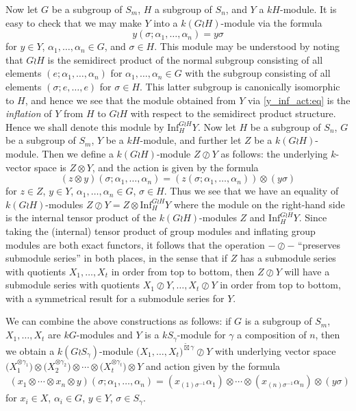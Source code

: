 \documentclass[10pt]{article}
\theoremstyle{definition}
\begin{document}
Now let $G$ be a subgroup of $S_m$, $H$ a subgroup of $S_n$, and $Y$ a $kH$-module. It is easy to check that we may make $Y$ into a
$k(G{\wr}H)$-module via the formula
\begin{equation}\label{y_inf_act:eq}
y(\sigma;\alpha_1,\ldots,\alpha_n) = y\sigma
\end{equation}
for $y \in Y$, $\alpha_1,\ldots,\alpha_n \in G$, and $\sigma \in H$. This module may be understood by noting that $G{\wr}H$ is the
semidirect product of the normal subgroup consisting of all elements $(e;\alpha_1,\ldots,\alpha_n)$ for $\alpha_1,\ldots,\alpha_n \in G$
with the subgroup consisting of all elements $(\sigma;e,\ldots,e)$ for $\sigma \in H$. This latter subgroup is canonically isomorphic to
$H$, and hence we see that the module obtained from $Y$ via \eqref{y_inf_act:eq} is the \textit{inflation} of $Y$ from $H$ to $G{\wr}H$
with respect to the semidirect product
structure. Hence we shall denote this module by $\mathrm{Inf}^{G{\wr}H}_H Y$.
Now let $H$ be a subgroup of $S_n$, $G$ be a subgroup of $S_m$, $Y$ be a $kH$-module, and further let $Z$ be a $k(G{\wr}H)$-module. Then
we define a $k(G{\wr}H)$-module $Z{\oslash}Y$ as follows: the underlying $k$-vector space is $Z{\otimes}Y$, and
the action is given by the formula
\[(z \otimes y)(\sigma;\alpha_1,\ldots,\alpha_n) = (z(\sigma;\alpha_1,\ldots,\alpha_n))\otimes(y\sigma)\]
for $z \in Z$, $y \in Y$, $\alpha_1,\ldots,\alpha_n \in G$, $\sigma \in H$.
Thus we see that we have an equality of $k(G{\wr}H)$-modules $Z{\oslash}Y = Z \otimes \mathrm{Inf}^{G{\wr}H}_H Y$
where the module on the right-hand side is the internal tensor product of the $k(G{\wr}H)$-modules $Z$ and $\mathrm{Inf}^{G{\wr}H}_H Y$.
Since taking the (internal) tensor product of group modules and inflating group modules are both exact functors, it follows that the
operation $- \oslash -$ ``preserves submodule series'' in both places, in the sense that if $Z$ has a submodule series with quotients
$X_1,\ldots,X_t$ in order from top to bottom, then $Z \oslash Y$ will have a submodule series with quotients $X_1 \oslash Y, \ldots,
X_t \oslash Y$ in order from top to bottom, with a symmetrical result for a submodule series for $Y$.

We can combine the above constructions as follows: if $G$ is a subgroup of $S_m$, $X_1,\ldots,X_t$ are $kG$-modules and $Y$ is a
$kS_{\gamma}$-module for $\gamma$ a composition of $n$, then we obtain a $k(G{\wr}S_{\gamma})$-module
$\bigl(X_1,\ldots,X_t\bigr)^{\widetilde\boxtimes\gamma}{\oslash}Y$
with underlying vector space
$\bigl(X^{\otimes \gamma_1}_1\bigr)\otimes\bigl(X^{\otimes \gamma_2}_2\bigr)\otimes\cdots\otimes\bigl(X^{\otimes \gamma_t}_t\bigr){\otimes}Y$
and action given by the formula
\begin{multline}\label{xs_twid_osl_y_act:eq}
	(x_1{\otimes}\cdots{\otimes}x_n{\otimes}y)(\sigma;\alpha_1,\ldots,\alpha_n) =
	(x_{(1)\sigma^{-1}}\alpha_1)\otimes\cdots\otimes(x_{(n)\sigma^{-1}}\alpha_n){\otimes}(y\sigma)
\end{multline}
for $x_i \in X$, $\alpha_i \in G$, $y \in Y$, $\sigma \in S_{\gamma}$.
\end{document}
